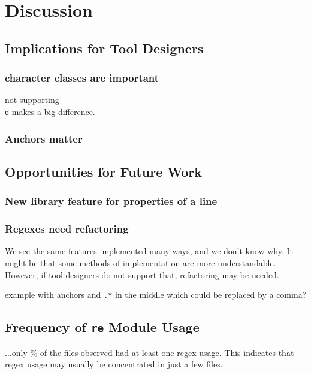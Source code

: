 \section{Discussion}
\label{sec:discussion}


\subsection{Implications for Tool Designers}

\subsubsection{character classes are important}
not supporting {\tt \\d} makes a big difference. 

\subsubsection{Anchors matter}

\subsection{Opportunities for Future Work}

\subsubsection{New library feature for properties of a line}

\subsubsection{Regexes need refactoring}
We see the same features implemented many ways, and we don't know why. It might be that some methods of implementation are more understandable. However, if tool designers do not support that, refactoring may be needed. 

example with anchors and {\tt .*} in the middle which could be replaced by a comma? 

\subsection{Frequency of {\tt re} Module Usage}
...only \% of the files observed had at least one regex usage.  This indicates that regex usage may usually be concentrated in just a few files.


